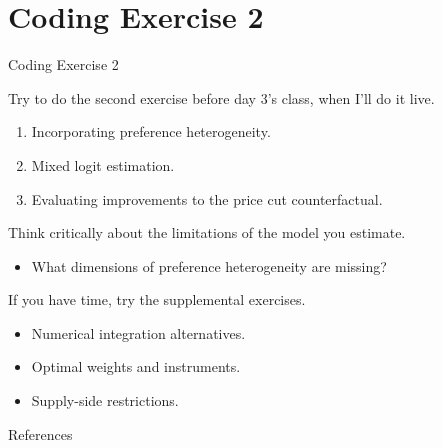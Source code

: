 \documentclass[aspectratio=169,t,11pt,table]{beamer}
\begin{document}
\section{Coding Exercise 2}

\begin{frame}{Coding Exercise 2}
    \begin{wideitemize}
        \item Try to do the second exercise before day 3's class, when I'll do it live.
        \begin{enumerate}
            \item Incorporating preference heterogeneity.
            \item Mixed logit estimation.
            \item Evaluating improvements to the price cut counterfactual.
        \end{enumerate}
        \pause
        \item Think critically about the limitations of the model you estimate.
        \begin{itemize}
            \item What dimensions of preference heterogeneity are missing?
        \end{itemize}
        \pause
        \item If you have time, try the supplemental exercises.
        \begin{itemize}
            \item Numerical integration alternatives.
            \item Optimal weights and instruments.
            \item Supply-side restrictions.
        \end{itemize}
    \end{wideitemize}
\end{frame}

\backupbegin

\begin{frame}{References}
    
\end{frame}

\backupend
\end{document}
